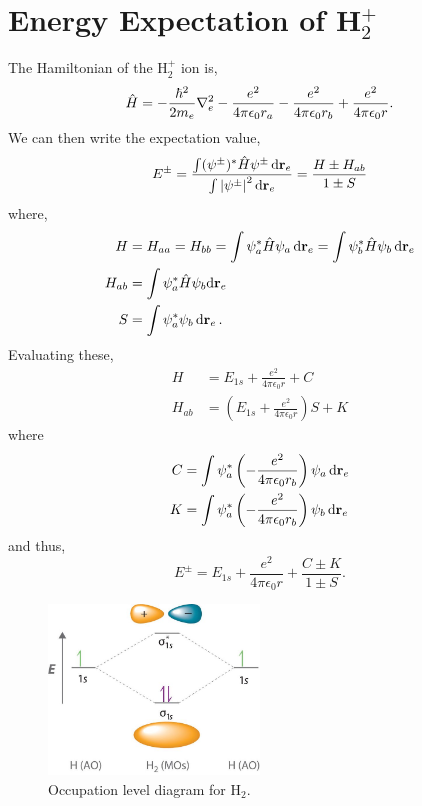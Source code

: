 \documentclass{book}
\begin{document}
\section{Energy Expectation of H$_2^+$}
The Hamiltonian of the H$_2^+$ ion is,
\begin{equation}
	\hat{H} = -\frac{\hbar^2}{2m_e}\laplacian_e -\frac{e^2}{4\pi \epsilon_0 r_a} -\frac{e^2}{4\pi \epsilon_0 r_b} + \frac{e^2}{4\pi \epsilon_0 r}.
\end{equation}
We can then write the expectation value,
\begin{equation}
	E^{\pm} = \frac{\int(\psi^{\pm})^*\hat{H}\psi^{\pm}\dd{\vb{r}}_e}{\int\abs{\psi^{\pm}}^2\dd{\vb{r}_e}} = \frac{H \pm H_{ab}}{1 \pm S}
\end{equation}
where,
\begin{align}
	H & = H_{aa} = H_{bb} = \int\psi_a^*\hat{H}\psi_a\dd{\vb{r}_e} = \int\psi_b^*\hat{H}\psi_b\dd{\vb{r}_e} \\
	H_{ab} & = \int\psi_a^*\hat{H}\psi_b \dd\vb{r}_e \\
	S & = \int\psi_a^*\psi_b\dd{\vb{r}_e}.
\end{align}
Evaluating these,
\begin{align}
	H & = E_{1s} + \frac{e^2}{4\pi\epsilon_0r} + C \\
	H_{ab} & = \left(E_{1s} + \frac{e^2}{4\pi\epsilon_0r}\right)S + K
\end{align}
where 
\begin{align}
	C & = \int\psi^*_a\left(-\frac{e^2}{4\pi\epsilon_0r_b}\right)\psi_a \dd{\vb{r}_e} \\
	K & = \int\psi_a^*\left(-\frac{e^2}{4\pi\epsilon_0r_b}\right)\psi_b\dd{\vb{r}}_e
\end{align}
and thus,
\begin{equation}
	E^{\pm} = E_{1s} + \frac{e^2}{4\pi\epsilon_0r} + \frac{C\pm K}{1\pm S}.
\end{equation}
\begin{figure}[h]
	\centering
	\includegraphics[width=0.5\textwidth]{mol.jpg}
	\caption{Occupation level diagram for H$_2$.}
	\label{fig:mol}
\end{figure}
\end{document}
